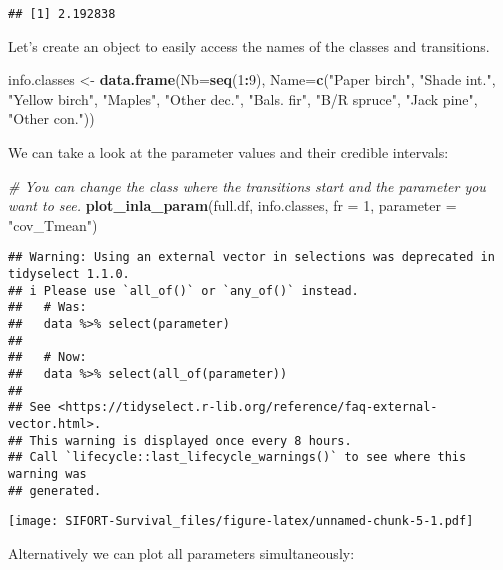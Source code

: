 \documentclass[
]{article}
\newenvironment{Shaded}{\begin{snugshade}}{\end{snugshade}}
\newcommand{\AttributeTok}[1]{\textcolor[rgb]{0.13,0.29,0.53}{#1}}
\newcommand{\CommentTok}[1]{\textcolor[rgb]{0.56,0.35,0.01}{\textit{#1}}}
\newcommand{\DecValTok}[1]{\textcolor[rgb]{0.00,0.00,0.81}{#1}}
\newcommand{\FunctionTok}[1]{\textcolor[rgb]{0.13,0.29,0.53}{\textbf{#1}}}
\newcommand{\NormalTok}[1]{#1}
\newcommand{\OtherTok}[1]{\textcolor[rgb]{0.56,0.35,0.01}{#1}}
\newcommand{\SpecialCharTok}[1]{\textcolor[rgb]{0.81,0.36,0.00}{\textbf{#1}}}
\newcommand{\StringTok}[1]{\textcolor[rgb]{0.31,0.60,0.02}{#1}}
\begin{document}
\begin{verbatim}
## [1] 2.192838
\end{verbatim}

Let's create an object to easily access the names of the classes and
transitions.

\begin{Shaded}
\begin{Highlighting}[]
\NormalTok{info.classes }\OtherTok{\textless{}{-}} \FunctionTok{data.frame}\NormalTok{(}\AttributeTok{Nb=}\FunctionTok{seq}\NormalTok{(}\DecValTok{1}\SpecialCharTok{:}\DecValTok{9}\NormalTok{), }\AttributeTok{Name=}\FunctionTok{c}\NormalTok{(}\StringTok{"Paper birch"}\NormalTok{, }\StringTok{"Shade int."}\NormalTok{, }\StringTok{"Yellow birch"}\NormalTok{, }\StringTok{"Maples"}\NormalTok{, }\StringTok{"Other dec."}\NormalTok{, }\StringTok{"Bals. fir"}\NormalTok{, }\StringTok{"B/R spruce"}\NormalTok{, }\StringTok{"Jack pine"}\NormalTok{, }\StringTok{"Other con."}\NormalTok{))}
\end{Highlighting}
\end{Shaded}

We can take a look at the parameter values and their credible intervals:

\begin{Shaded}
\begin{Highlighting}[]
\CommentTok{\# You can change the class where the transitions start and the parameter you want to see.}
\FunctionTok{plot\_inla\_param}\NormalTok{(full.df, info.classes, }\AttributeTok{fr =} \DecValTok{1}\NormalTok{, }\AttributeTok{parameter =} \StringTok{"cov\_Tmean"}\NormalTok{)}
\end{Highlighting}
\end{Shaded}

\begin{verbatim}
## Warning: Using an external vector in selections was deprecated in tidyselect 1.1.0.
## i Please use `all_of()` or `any_of()` instead.
##   # Was:
##   data %>% select(parameter)
## 
##   # Now:
##   data %>% select(all_of(parameter))
## 
## See <https://tidyselect.r-lib.org/reference/faq-external-vector.html>.
## This warning is displayed once every 8 hours.
## Call `lifecycle::last_lifecycle_warnings()` to see where this warning was
## generated.
\end{verbatim}

\texttt{[image: SIFORT-Survival\_files/figure-latex/unnamed-chunk-5-1.pdf]}

Alternatively we can plot all parameters simultaneously:
\end{document}
